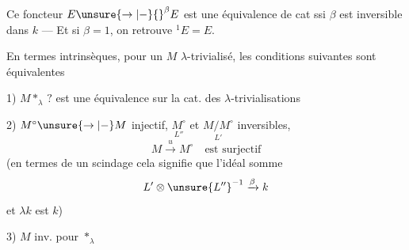 Ce foncteur $E\unsure{\to|-}{}^\beta E$  est une équivalence de cat ssi $\beta$ est inversible dans $k$ --- Et si $\beta=1$, on retrouve ${}^1E=E$.

En termes intrinsèques, pour  un $M$ $\lambda$-trivialisé, les conditions suivantes sont équivalentes

1) $M\mathbin{*}_{\lambda}\,?$ est une équivalence sur la cat. des $\lambda$-trivialisations

2) $M^\circ\unsure{\to|-}M$ injectif, $\underset{L''}{M^\circ}$ et $\underset{L'}{M/M^\circ}$ inversibles,
\[
M\xrightarrow{u}M^\circ\quad\text{est surjectif}
\]
(en termes de  un scindage cela signifie que l'idéal somme 
\[
L'\otimes\unsure{L''}^{-1}\xrightarrow{\beta}k
\]
et $\lambda k$ est $k$)

3) $M$ inv. pour $\mathbin{*}_{\lambda}$
